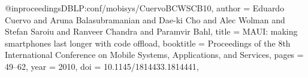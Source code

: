 @inproceedings{DBLP:conf/mobisys/CuervoBCWSCB10,
  author    = {Eduardo Cuervo and Aruna Balasubramanian and Dae{-}ki Cho and Alec Wolman and Stefan Saroiu and Ranveer Chandra and Paramvir Bahl},
  title     = {{MAUI:} making smartphones last longer with code offload},
  booktitle = {Proceedings of the 8th International Conference on Mobile Systems, Applications, and Services},
  pages     = {49--62},
  year      = {2010},
  doi       = {10.1145/1814433.1814441},
}
